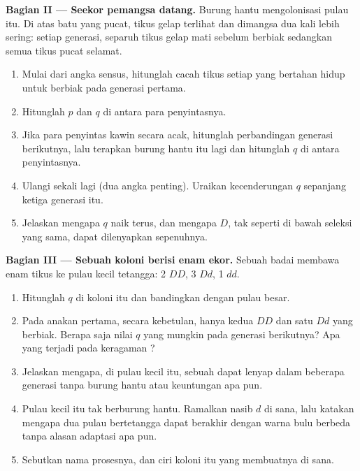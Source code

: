 \begin{problem}
\medskip
\noindent\textbf{Bagian II --- Seekor pemangsa datang.}
Burung hantu mengolonisasi pulau itu. Di atas batu yang pucat, tikus
gelap terlihat dan dimangsa dua kali lebih sering: setiap generasi,
separuh tikus gelap mati sebelum berbiak sedangkan semua tikus pucat
selamat.
\begin{enumerate}[resume]
  \item Mulai dari angka sensus, hitunglah cacah tikus setiap 
        yang bertahan hidup untuk berbiak pada generasi pertama.
  \item Hitunglah $p$ dan $q$ di antara para penyintasnya.
  \item Jika para penyintas kawin secara acak, hitunglah perbandingan
         generasi berikutnya, lalu terapkan burung hantu itu
        lagi dan hitunglah $q$ di antara penyintasnya.
  \item Ulangi sekali lagi (dua angka penting). Uraikan kecenderungan
        $q$ sepanjang ketiga generasi itu.
  \item Jelaskan mengapa $q$ naik terus, dan mengapa $D$, tak seperti
          di bawah seleksi yang sama, dapat dilenyapkan
        sepenuhnya.
\end{enumerate}

\medskip
\noindent\textbf{Bagian III --- Sebuah koloni berisi enam ekor.}
Sebuah badai membawa enam tikus ke pulau kecil tetangga: 2 $DD$, 3 $Dd$, 1 $dd$.
\begin{enumerate}[resume]
  \item Hitunglah $q$ di koloni itu dan bandingkan dengan pulau besar.
  \item Pada anakan pertama, secara kebetulan, hanya kedua $DD$ dan
        satu $Dd$ yang berbiak. Berapa saja nilai $q$ yang mungkin pada
        generasi berikutnya? Apa yang terjadi pada keragaman ?
  \item Jelaskan mengapa, di pulau kecil itu, sebuah  dapat lenyap
        dalam beberapa generasi tanpa burung hantu atau keuntungan apa
        pun.
  \item Pulau kecil itu tak berburung hantu. Ramalkan nasib $d$ di
        sana, lalu katakan mengapa dua pulau bertetangga dapat berakhir
        dengan warna bulu berbeda tanpa alasan adaptasi apa pun.
  \item Sebutkan nama prosesnya, dan ciri koloni itu yang membuatnya
         di sana.
\end{enumerate}


\end{problem}
